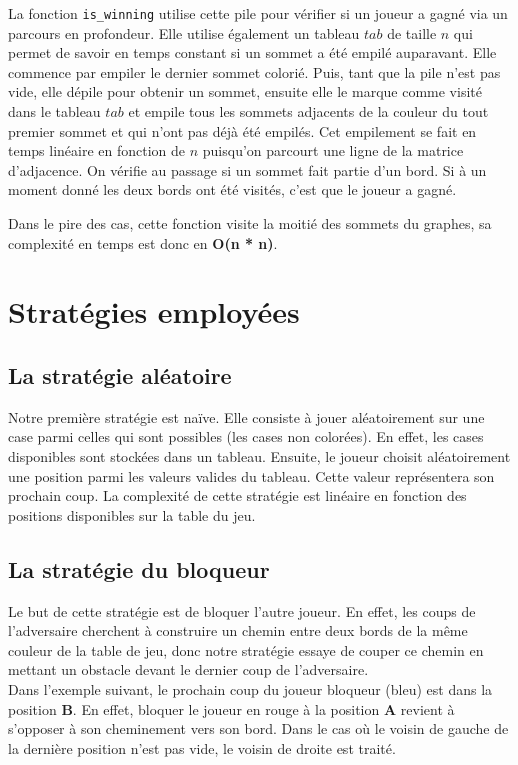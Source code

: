 \documentclass{article}
\begin{document}
La fonction \lstinline{is_winning} utilise cette pile pour vérifier si un joueur a gagné via un parcours en profondeur. Elle utilise également un tableau $tab$ de taille $n$ qui permet de savoir en temps constant si un sommet a été empilé auparavant. Elle commence par empiler le dernier sommet colorié. Puis, tant que la pile n'est pas vide, elle dépile pour obtenir un sommet, ensuite elle le marque comme visité dans le tableau $tab$ et empile tous les sommets adjacents de la couleur du tout premier sommet et qui n'ont pas déjà été empilés. Cet empilement se fait en temps linéaire en fonction de $n$ puisqu'on parcourt une ligne de la matrice d'adjacence. On vérifie au passage si un sommet fait partie d'un bord. Si à un moment donné les deux bords ont été visités, c'est que le joueur a gagné.

Dans le pire des cas, cette fonction visite la moitié des sommets du graphes, sa complexité en temps est donc en \textbf{O(n * n)}.

\section{Stratégies employées}

\subsection{La stratégie aléatoire}
Notre première stratégie est naïve. Elle consiste à jouer aléatoirement sur une case parmi celles qui sont possibles (les cases non colorées). En effet, les cases disponibles sont stockées dans un tableau. Ensuite, le joueur choisit aléatoirement une position parmi les valeurs valides du tableau. Cette valeur représentera son prochain coup.  
La complexité de cette stratégie est linéaire en fonction des positions disponibles sur la table du jeu.

\subsection{La stratégie du bloqueur}
Le but de cette stratégie est de bloquer l'autre joueur. En effet, les coups de l'adversaire cherchent à construire un chemin entre deux bords de la même couleur de la table de jeu, donc notre stratégie essaye de couper ce chemin en mettant un obstacle devant le dernier coup de l'adversaire.
\\

Dans l'exemple suivant, le prochain coup du joueur bloqueur (bleu) est dans la position \textbf{B}. En effet, bloquer le joueur en rouge à la position \textbf{A} revient à s'opposer à son cheminement vers son bord.
Dans le cas où le voisin de gauche de la dernière position n'est pas vide, le voisin de droite est traité.
\end{document}
